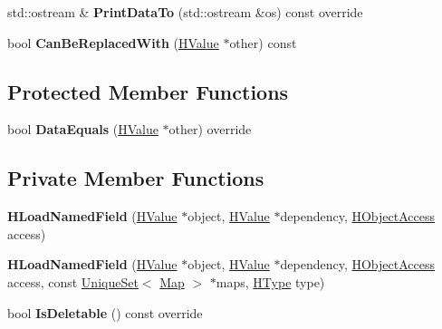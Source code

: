 \begin{DoxyCompactItemize}
\item 
std\+::ostream \& {\bfseries Print\+Data\+To} (std\+::ostream \&os) const  override\hypertarget{classv8_1_1internal_1_1_h_load_named_field_a0d1da32db88fdfe0e07010d03f4c6d50}{}\label{classv8_1_1internal_1_1_h_load_named_field_a0d1da32db88fdfe0e07010d03f4c6d50}

\item 
bool {\bfseries Can\+Be\+Replaced\+With} (\hyperlink{classv8_1_1internal_1_1_h_value}{H\+Value} $\ast$other) const \hypertarget{classv8_1_1internal_1_1_h_load_named_field_acc52bc921c1a9735df7bd24287672a1c}{}\label{classv8_1_1internal_1_1_h_load_named_field_acc52bc921c1a9735df7bd24287672a1c}

\end{DoxyCompactItemize}
\subsection*{Protected Member Functions}
\begin{DoxyCompactItemize}
\item 
bool {\bfseries Data\+Equals} (\hyperlink{classv8_1_1internal_1_1_h_value}{H\+Value} $\ast$other) override\hypertarget{classv8_1_1internal_1_1_h_load_named_field_a4685ae28c46219aa0b63b99631a5c893}{}\label{classv8_1_1internal_1_1_h_load_named_field_a4685ae28c46219aa0b63b99631a5c893}

\end{DoxyCompactItemize}
\subsection*{Private Member Functions}
\begin{DoxyCompactItemize}
\item 
{\bfseries H\+Load\+Named\+Field} (\hyperlink{classv8_1_1internal_1_1_h_value}{H\+Value} $\ast$object, \hyperlink{classv8_1_1internal_1_1_h_value}{H\+Value} $\ast$dependency, \hyperlink{classv8_1_1internal_1_1_h_object_access}{H\+Object\+Access} access)\hypertarget{classv8_1_1internal_1_1_h_load_named_field_a7d90ce287276527f58c6e54d3d845b09}{}\label{classv8_1_1internal_1_1_h_load_named_field_a7d90ce287276527f58c6e54d3d845b09}

\item 
{\bfseries H\+Load\+Named\+Field} (\hyperlink{classv8_1_1internal_1_1_h_value}{H\+Value} $\ast$object, \hyperlink{classv8_1_1internal_1_1_h_value}{H\+Value} $\ast$dependency, \hyperlink{classv8_1_1internal_1_1_h_object_access}{H\+Object\+Access} access, const \hyperlink{classv8_1_1internal_1_1_unique_set}{Unique\+Set}$<$ \hyperlink{classv8_1_1internal_1_1_map}{Map} $>$ $\ast$maps, \hyperlink{classv8_1_1internal_1_1_h_type}{H\+Type} type)\hypertarget{classv8_1_1internal_1_1_h_load_named_field_a2a82c7b177262c1fcc8fb88111132198}{}\label{classv8_1_1internal_1_1_h_load_named_field_a2a82c7b177262c1fcc8fb88111132198}

\item 
bool {\bfseries Is\+Deletable} () const  override\hypertarget{classv8_1_1internal_1_1_h_load_named_field_ad3bb799f4d6095927384eea51a6648db}{}\label{classv8_1_1internal_1_1_h_load_named_field_ad3bb799f4d6095927384eea51a6648db}

\end{DoxyCompactItemize}
